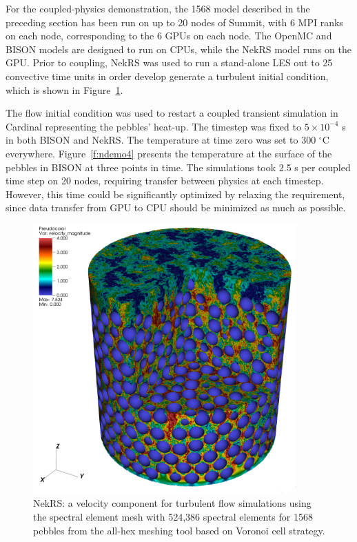 For the coupled-physics demonstration, the 1568 model described in the preceding
section has been run on up to 20 nodes of Summit, with 6 MPI ranks on each
node, corresponding to the 6 GPUs on each node. The OpenMC and BISON models are
designed to run on CPUs, while the NekRS model runs on the GPU. Prior to
coupling, NekRS was used to run a stand-alone LES out to 25 convective time
units in order develop generate a turbulent initial condition, which is shown
in Figure~\ref{f:ndemo3}.

The flow initial condition was used to restart a coupled transient simulation in
Cardinal representing the pebbles' heat-up. The timestep was fixed to $5\times
10^{-4}$ s in both BISON and NekRS. The temperature at time zero was set to 300
$^{\circ}$C everywhere. Figure~\ref{f:ndemo4} presents the temperature at the
surface of the pebbles in BISON at three points in time. The simulations took
2.5 s per coupled time step on 20 nodes, requiring transfer between physics at
each timestep. However, this time could be significantly optimized by relaxing
the requirement, since data transfer from GPU to CPU should be minimized as
much as possible.

\begin{figure}[!h]
\centering
\includegraphics[clip=true,width=0.9\textwidth]{Figures/ndemo_r3}
\caption{NekRS: a velocity component for turbulent flow simulations using the
spectral element mesh with 524,386 spectral elements for 1568 pebbles from the
all-hex meshing tool based on Voronoi cell strategy. }
\label{f:ndemo3}
\end{figure}



